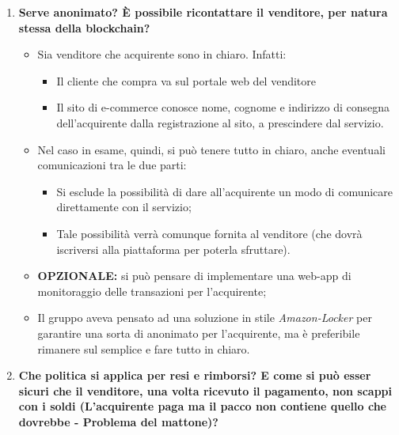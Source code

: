 \documentclass[11pt]{article}
\begin{document}
\begin{enumerate}
				\bigskip				
				
				\item \textbf{Serve anonimato? È possibile ricontattare il venditore, per natura stessa della blockchain?}
				
				\medskip
				
				\begin{itemize}
					\item Sia venditore che acquirente sono in chiaro. Infatti:
					\begin{itemize}
						\item Il cliente che compra va sul portale web del venditore 
						\item Il sito di e-commerce conosce nome, cognome e indirizzo di consegna dell'acquirente dalla
						registrazione al sito, a prescindere dal servizio.
					\end{itemize}
					\item Nel caso in esame, quindi, si può tenere tutto in chiaro, anche eventuali comunicazioni tra le due
					parti:
					\begin{itemize}
						\item Si esclude la possibilità di dare all'acquirente un modo di comunicare direttamente con il servizio;
						\item Tale possibilità verrà comunque fornita al venditore (che dovrà iscriversi alla piattaforma per
						poterla sfruttare).
					\end{itemize}
					\item \textbf{OPZIONALE:} si può pensare di implementare una web-app di monitoraggio delle transazioni
					per l'acquirente;
					\item Il gruppo aveva pensato ad una soluzione in stile \textit{Amazon-Locker} per garantire una sorta di anonimato per
					l'acquirente, ma è preferibile rimanere sul semplice e fare tutto in chiaro.
				\end{itemize}
				
				\bigskip
				
				\item \textbf{Che politica si applica per resi e rimborsi? E come si può esser sicuri che il venditore, una volta
				ricevuto il pagamento, non scappi con i soldi (L'acquirente paga ma il pacco non contiene quello che dovrebbe -
				Problema del mattone)?}
				
				\medskip
				

\end{enumerate}
\end{document}
